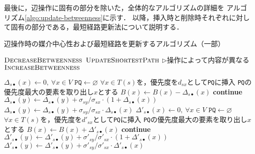 最後に，辺操作に固有の部分を除いた，全体的なアルゴリズムの詳細を
アルゴリズム\ref{algo:update-betweenness}に示す．
以降，挿入時と削除時それぞれに対して固有の部分である，最短経路更新法について説明する．

\begin{algorithm}[tbp]
  \caption{辺操作時の媒介中心性および最短経路を更新するアルゴリズム（一部）}
  \label{algo:update-betweenness}
  \begin{algorithmic}[1]\small
    \State $\textproc{DecreaseBetweenness}$
    \State $\textproc{UpdateShortestPath}$
    \hspace{.3cm}$\triangleright$操作によって内容が異なる
    \State $\textproc{IncreaseBetweenness}$
    \EndProcedure
  \end{algorithmic}
  \vspace{-.5cm}
  \begin{multicols}{2}
    \begin{algorithmic}[1]\small
      \makeatletter
      \setcounter{ALG@line}{5}
      \makeatother
      \State $\Delta_{s\bullet}(x)\gets0,\:\forall x\in V$
      \State $\texttt{PQ}\gets\varnothing$
      \State $\forall x\in T(s)$を，優先度を$d_{sx}$として\texttt{PQ}に挿入
      \State \texttt{PQ}の優先度最大の要素を取り出し$x$とする
      \State $B(x)\gets B(x)-\Delta_{s\bullet}(x)$
      \State \textbf{continue}
      \EndIf
      \State $\Delta_{s\bullet}(y)\gets\Delta_{s\bullet}(y)+\sigma_{sy}/\sigma_{sx}\cdot(1+\Delta_{s\bullet}(x))$
      \Else
      \State $\Delta_{s\bullet}(y)\gets\Delta_{s\bullet}(y)+\sigma_{sy}/\sigma_{sx}\cdot\Delta_{s\bullet}(x)$
      \EndIf
      \EndFor
      \EndWhile
      \EndFor
      \EndProcedure
      \vfill\null
      \columnbreak
      \State $\Delta'_{s\bullet}(x)\gets0,\:\forall x\in V$
      \State $\texttt{PQ}\gets\varnothing$
      \State $\forall x\in T(s)$を，優先度を$d'_{sx}$として\texttt{PQ}に挿入
      \State \texttt{PQ}の優先度最大の要素を取り出し$x$とする
      \State $B(x)\gets B(x)+\Delta'_{s\bullet}(x)$
      \State \textbf{continue}
      \EndIf
      \State $\Delta'_{s\bullet}(y)\gets\Delta'_{s\bullet}(y)+\sigma'_{sy}/\sigma'_{sx}\cdot(1+\Delta'_{s\bullet}(x))$
      \Else
      \State $\Delta'_{s\bullet}(y)\gets\Delta'_{s\bullet}(y)+\sigma'_{sy}/\sigma'_{sx}\cdot\Delta'_{s\bullet}(x)$
      \EndIf
      \EndFor
      \EndWhile
      \EndFor
      \EndProcedure
    \end{algorithmic}
  \end{multicols}
\end{algorithm}

